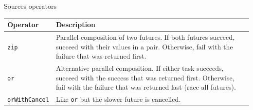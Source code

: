 \documentclass[aspectratio=1610,xcolor=dvipsnames,handout]{beamer}
\begin{document}
%
\begin{frame}{Sources operators}
  \small
  \begin{table}
    \centering
    \renewcommand{\arraystretch}{1.5}
    \begin{tabular}{ | m{4cm} | m{9cm} | } 
      \hline
      \textbf{Operator} & \textbf{Description} \\
      \hline
      \hline
      \texttt{zip} & Parallel composition of two futures. If both futures succeed, succeed with their values in a pair. Otherwise, fail with the failure that was returned first. \\ 
      \hline
      \texttt{or} & Alternative parallel composition. If either task succeeds, succeed with the success that was returned first. Otherwise, fail with the failure that was returned last (race all futures). \\
      \hline
      \texttt{orWithCancel} & Like \texttt{or} but the slower future is cancelled. \\ 
      \hline
    \end{tabular}
  \end{table}
\end{frame}
%
\end{document}

